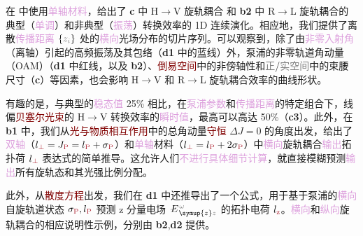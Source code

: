 在  中使用\textcolor{Plum}{单轴材料}，给出了 \textbf{c} 中 H$\to$V \textcolor{NavyBlue}{旋轨耦合} 和 \textbf{b2} 中 R$\to$L \textcolor{NavyBlue}{旋轨耦合}的典型（\textcolor{Plum}{单调}）和非典型（\textcolor{Plum}{振荡}）转换效率的 1D 连续演化。相应地，我们提供了离散\textcolor{Plum}{传播距离} $\{\mathcolor{gray}{z_i}\}$ 处的\textcolor{Plum}{横向}\textcolor{PineGreen}{光场分布}的切片序列。可以观察到，除了由\textcolor{Plum}{非零入射角}（\textcolor{PineGreen}{离轴}）引起的高频振荡及其包络（\textbf{d1} 中的蓝线）外，\textcolor{NavyBlue}{泵浦}的\textcolor{NavyBlue}{非零轨道角动量（OAM）}（\textbf{d1} 中红线，以及 \textbf{b2}）、\textcolor{Maroon}{倒易空间}中的\textcolor{PineGreen}{非傍轴性}和\textcolor{gray}{正}/\textcolor{gray}{实空间}中的束腰尺寸（\textbf{c}）等因素，也会影响 H$\to$V 和 R$\to$L \textcolor{NavyBlue}{旋轨耦合}效率的曲线形状。

有趣的是，与典型的\textcolor{Plum}{稳态值} 25\% 相比，在\textcolor{Plum}{泵浦参数}和\textcolor{Plum}{传播距离}的特定组合下，\textcolor{PineGreen}{线偏}\textcolor{Maroon}{贝塞尔光束}的 H$\to$V 转换效率的\textcolor{Plum}{瞬时值}，最高可以高达 50\%\cite{belyiPropagationHighorderCircularly2011,belyiSpintoorbitalAngularMomentum2013,khoninaComparativeInvestigationNonparaxial2015}（\textbf{c3}）。此外，在 \textbf{b1} 中，我们从\textcolor{Maroon}{光与物质相互作用}中的\textcolor{NavyBlue}{总角动量}\textcolor{Maroon}{守恒} $\Delta J = 0$ 的角度出发，给出了\textcolor{Plum}{双轴}（$l_{\textcolor{Maroon}{\perp}}=J_{\textcolor{Maroon}{\text{P}}}=l_{\textcolor{Maroon}{\text{P}}}+\sigma_{\textcolor{Maroon}{\text{P}}}$）\cite{berryOrbitalSpinAngular2005}和\textcolor{Plum}{单轴}材料（$l_{\textcolor{Maroon}{\perp}}=l_{\textcolor{Maroon}{\text{P}}}+2\sigma_{\textcolor{Maroon}{\text{P}}}$）\cite{ciattoniCircularlyPolarizedBeams2003,ciattoniAngularMomentumDynamics2003,tangHarmonicSpinOrbit2020}中\textcolor{Plum}{横向}\textcolor{NavyBlue}{旋轨耦合}\textcolor{Plum}{输出}\textcolor{NavyBlue}{拓扑荷} $l_{\textcolor{Maroon}{\perp}}$ 表达式的简单推导。这允许人们\textcolor{Plum}{不进行具体细节计算}，就直接模糊预测\textcolor{Plum}{输出}所有\textcolor{NavyBlue}{旋轨态}和其\textcolor{NavyBlue}{光强比例分配}。

此外，从\textcolor{Maroon}{散度方程}出发，我们在 \textbf{d1} 中还推导出了一个公式，用于基于\textcolor{NavyBlue}{泵浦}的\textcolor{Plum}{横向}\textcolor{NavyBlue}{自旋轨道状态} $\sigma_{\textcolor{Maroon}{\text{P}}},l_{\textcolor{Maroon}{\text{P}}}$ 预测 z 分量电场 $\Xint{\mathcolor{gray}{-}}{25}{E}^{\;\!\mathcolor{gray}{\omega}}_{\;\! \symup{z} \mathcolor{gray}{z}}$ 的\textcolor{NavyBlue}{拓扑电荷} $l_{\textcolor{Maroon}{\text{z}}}$。\textcolor{Plum}{横向}和\textcolor{Plum}{纵向}\textcolor{NavyBlue}{旋轨耦合}的相应说明性示例，分别由 \textbf{b2},\textbf{d2} 提供。

